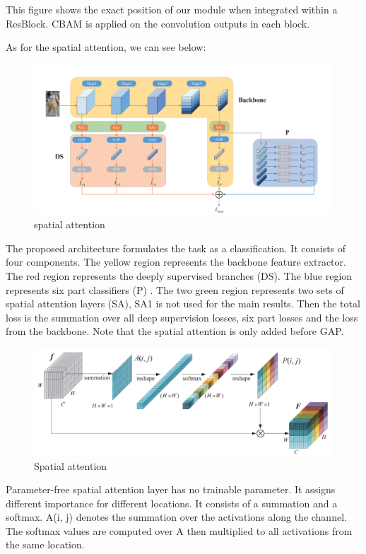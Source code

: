 This figure shows
the exact position of our module when integrated within a ResBlock. CBAM is applied on the convolution outputs in each block.

As for the spatial attention, we can see below:

\begin{figure}[H]
  \centering
  \includegraphics[width=\linewidth]{figs/spatial1.png}
  \caption{spatial attention}
  \label{fig:example}
\end{figure}

The proposed architecture formulates the task as a classification. It consists of four components. The yellow region represents the
backbone feature extractor. The red region represents the deeply supervised branches (DS). The blue region represents six part classifiers
(P) . The two green region represents two sets of spatial attention layers (SA), SA1 is not used for the main results. Then the total loss is the summation over all deep supervision losses, six part losses and the
loss from the backbone. Note that the spatial attention is only added before GAP.

\begin{figure}[H]
  \centering
  \includegraphics[width=\linewidth]{figs/spatial2.png}
  \caption{Spatial attention}
  \label{fig:example}
\end{figure}

Parameter-free spatial attention layer has no trainable parameter. It assigns different importance for different locations. It consists
of a summation and a softmax. A(i, j) denotes the summation over the activations along the channel. The softmax values are computed over A then multiplied to all activations from the same location.

